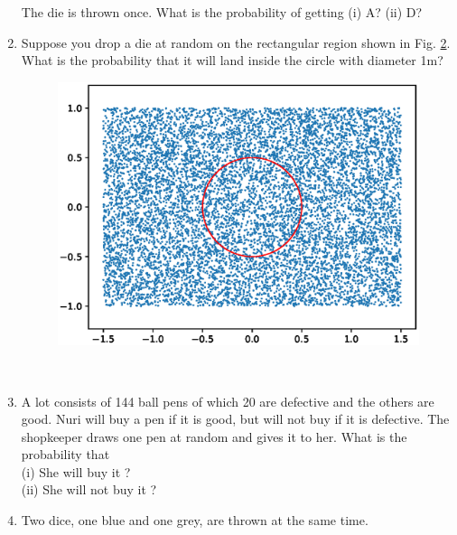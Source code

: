 \begin{enumerate}[label=\arabic*.,ref=\thesubsection.\theenumi]
\begin{figure}[!ht]
\centering
\resizebox{\columnwidth}{!}{}
\caption{}
\label{fig:130_dice}	
\end{figure}

The die is thrown once. What is the probability of getting (i) A? (ii) D?
\\
\solution

\item Suppose you drop a die at random on the rectangular region shown in Fig. \ref{fig:1.2.131}. What is the probability that it will land inside the circle with diameter 1m?
\begin{figure}[!ht]
\centering
\includegraphics[width=\columnwidth]{./prob/figs/rectangle.eps}
\caption{}
\label{fig:1.2.131}
\end{figure}
\\
\solution

\item A lot consists of 144 ball pens of which 20 are defective and the others are good. Nuri will buy a pen if it is good, but will not buy if it is defective. The shopkeeper draws one pen at random and gives it to her. What is the probability that\\
(i) She will buy it ?\\
(ii) She will not buy it ?
\\
\solution

\item Two dice, one blue and one grey, are thrown at the same time.  
\begin{enumerate}

\end{enumerate}
\end{enumerate}
